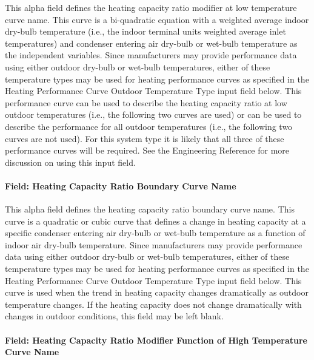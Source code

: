 This alpha field defines the heating capacity ratio modifier at low temperature curve name. This curve is a bi-quadratic equation with a weighted average indoor dry-bulb temperature (i.e., the indoor terminal units weighted average inlet temperatures) and condenser entering air dry-bulb or wet-bulb temperature as the independent variables. Since manufacturers may provide performance data using either outdoor dry-bulb or wet-bulb temperatures, either of these temperature types may be used for heating performance curves as specified in the Heating Performance Curve Outdoor Temperature Type input field below. This performance curve can be used to describe the heating capacity ratio at low outdoor temperatures (i.e., the following two curves are used) or can be used to describe the performance for all outdoor temperatures (i.e., the following two curves are not used). For this system type it is likely that all three of these performance curves will be required. See the Engineering Reference for more discussion on using this input field.

\paragraph{Field: Heating Capacity Ratio Boundary Curve Name}\label{field-heating-capacity-ratio-boundary-curve-name}

This alpha field defines the heating capacity ratio boundary curve name. This curve is a quadratic or cubic curve that defines a change in heating capacity at a specific condenser entering air dry-bulb or wet-bulb temperature as a function of indoor air dry-bulb temperature. Since manufacturers may provide performance data using either outdoor dry-bulb or wet-bulb temperatures, either of these temperature types may be used for heating performance curves as specified in the Heating Performance Curve Outdoor Temperature Type input field below. This curve is used when the trend in heating capacity changes dramatically as outdoor temperature changes. If the heating capacity does not change dramatically with changes in outdoor conditions, this field may be left blank.

\paragraph{Field: Heating Capacity Ratio Modifier Function of High Temperature Curve Name}\label{field-heating-capacity-ratio-modifier-function-of-high-temperature-curve-name}

